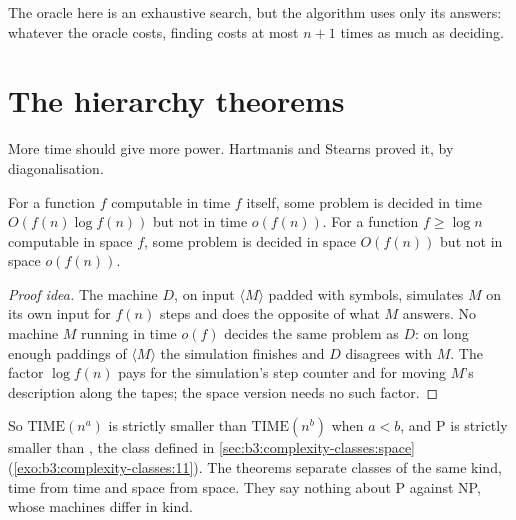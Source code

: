 \label{lst:b3:complexity-classes:self-reduce}

\label{out:b3:complexity-classes:self-reduce}

The oracle here is an exhaustive search, but the algorithm uses only its answers: whatever the oracle costs, finding costs at most $n + 1$ times as much as deciding.

\section{The hierarchy theorems}\label{sec:b3:complexity-classes:hierarchy}

More time should give more power. Hartmanis and Stearns proved it, by diagonalisation.

\begin{theorem}\label{thm:b3:complexity-classes:hierarchy}
For a function $f$ computable in time $f$ itself, some problem is decided in time $O(f(n) \log f(n))$ but not in time $o(f(n))$. For a function $f \ge \log n$ computable in space $f$, some problem is decided in space $O(f(n))$ but not in space $o(f(n))$.
\end{theorem}

\begin{proof}[Proof idea]
The machine $D$, on input $\langle M \rangle$ padded with symbols, simulates $M$ on its own input for $f(n)$ steps and does the opposite of what $M$ answers. No machine $M$ running in time $o(f)$ decides the same problem as $D$: on long enough paddings of $\langle M \rangle$ the simulation finishes and $D$ disagrees with $M$. The factor $\log f(n)$ pays for the simulation's step counter and for moving $M$'s description along the tapes; the space version needs no such factor.
\end{proof}

So $\mathrm{TIME}(n^a)$ is strictly smaller than $\mathrm{TIME}(n^b)$ when $a < b$, and P is strictly smaller than , the class defined in \cref{sec:b3:complexity-classes:space} (\cref{exo:b3:complexity-classes:11}). %
The theorems separate classes of the same kind, time from time and space from space. They say nothing about P against NP, whose machines differ in kind.

